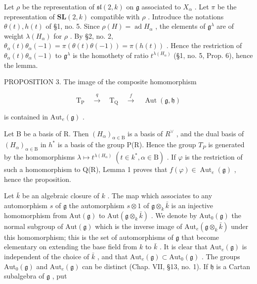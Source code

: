 Let \(\rho\) be the representation of \(\mathfrak{sl}(2,k)\) on \(\mathfrak{g}\) associated to \(X_{\alpha}\) . Let \(\pi\) be the representation of \(\mathbf{SL}(2,k)\) compatible with \(\rho\) . Introduce the notations \(\theta(t), h(t)\) of §1, no. 5. Since \(\rho(H) = \operatorname{ad} H_{\alpha}\) , the elements of \(\mathfrak{g}^{\lambda}\) are of weight \(\lambda(H_{\alpha})\) for \(\rho\) . By §2, no. 2, \(\theta_{\alpha}(t)\theta_{\alpha}(-1) = \pi(\theta(t)\theta(-1)) = \pi(h(t))\) . Hence the restriction of \(\theta_{\alpha}(t)\theta_{\alpha}(-1)\) to \(\mathfrak{g}^{\lambda}\) is the homothety of ratio \(t^{\lambda(H_{\alpha})}\) (§1, no. 5, Prop. 6), hence the lemma.

PROPOSITION 3. The image of the composite homomorphism

\[
\mathrm{T} _ {\mathrm{P}} \quad \xrightarrow {q} \quad \mathrm{T} _ {\mathrm{Q}} \quad \xrightarrow {f} \quad \operatorname{Aut} (\mathfrak {g}, \mathfrak {h})
\]

is contained in \(\mathrm{Aut}_e(\mathfrak{g})\) .

Let B be a basis of R. Then \((H_{\alpha})_{\alpha\in\mathrm{B}}\) is a basis of \(R^{\vee}\) , and the dual basis of \((H_{\alpha})_{\alpha\in\mathrm{B}}\) in \(h^{*}\) is a basis of the group P(R). Hence the group \(T_{P}\) is generated by the homomorphisms \(\lambda\mapsto t^{\lambda(H_{\alpha})}\;(t\in k^{*},\alpha\in\mathrm{B})\) . If \(\varphi\) is the restriction of such a homomorphism to Q(R), Lemma 1 proves that \(f(\varphi)\in\operatorname{Aut}_{e}(\mathfrak{g})\) , hence the proposition.

Let \(\bar{k}\) be an algebraic closure of \(k\) . The map which associates to any automorphism \(s\) of \(\mathfrak{g}\) the automorphism \(s \otimes 1\) of \(\mathfrak{g} \otimes_k \bar{k}\) is an injective homomorphism from \(\mathrm{Aut}(\mathfrak{g})\) to \(\mathrm{Aut}(\mathfrak{g} \otimes_k \bar{k})\) . We denote by \(\mathrm{Aut}_0(\mathfrak{g})\) the normal subgroup of \(\mathrm{Aut}(\mathfrak{g})\) which is the inverse image of \(\mathrm{Aut}_e(\mathfrak{g} \otimes_k \bar{k})\) under this homomorphism; this is the set of automorphisms of \(\mathfrak{g}\) that become elementary on extending the base field from \(k\) to \(\bar{k}\) . It is clear that \(\mathrm{Aut}_e(\mathfrak{g})\) is independent of the choice of \(\bar{k}\) , and that \(\mathrm{Aut}_e(\mathfrak{g}) \subset \mathrm{Aut}_0(\mathfrak{g})\) . The groups \(\mathrm{Aut}_0(\mathfrak{g})\) and \(\mathrm{Aut}_e(\mathfrak{g})\) can be distinct (Chap. VII, §13, no. 1). If \(\mathfrak{h}\) is a Cartan subalgebra of \(\mathfrak{g}\) , put

